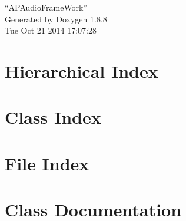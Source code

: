 \documentclass[twoside]{book}
\newcommand{\+}{\discretionary{\mbox{\scriptsize$\hookleftarrow$}}{}{}}
\newcommand{\clearemptydoublepage}{%
  \newpage{\pagestyle{empty}\cleardoublepage}%
}
\begin{document}
\hypersetup{pageanchor=false,
             bookmarks=true,
             bookmarksnumbered=true,
             pdfencoding=unicode
            }
\begin{titlepage}
\vspace*{7cm}
\begin{center}%
{\Large “\+A\+P\+Audio\+Frame\+Work” }\\
\vspace*{1cm}
{\large Generated by Doxygen 1.8.8}\\
\vspace*{0.5cm}
{\small Tue Oct 21 2014 17:07:28}\\
\end{center}
\end{titlepage}
\clearemptydoublepage
\tableofcontents
\clearemptydoublepage
{}
\hypersetup{pageanchor=true}

\chapter{Hierarchical Index}

\chapter{Class Index}

\chapter{File Index}

\chapter{Class Documentation}
















































\end{document}
